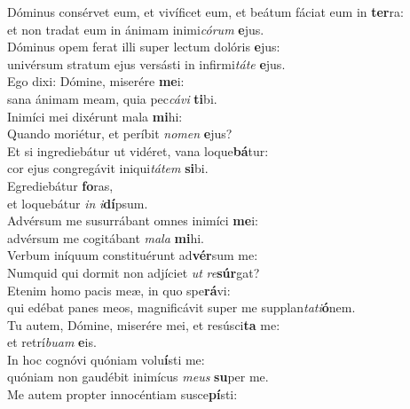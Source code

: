 \evenverse Dóminus consérvet eum, et vivíficet eum, et beátum fáciat eum in \textbf{ter}ra:~\*\\
\evenverse et non tradat eum in ánimam inimi\textit{có}\textit{rum} \textbf{e}jus.\\
\oddverse Dóminus opem ferat illi super lectum dolóris \textbf{e}jus:~\*\\
\oddverse univérsum stratum ejus versásti in infirmi\textit{tá}\textit{te} \textbf{e}jus.\\
\evenverse Ego dixi: Dómine, miserére \textbf{me}i:~\*\\
\evenverse sana ánimam meam, quia pec\textit{cá}\textit{vi} \textbf{ti}bi.\\
\oddverse Inimíci mei dixérunt mala \textbf{mi}hi:~\*\\
\oddverse Quando moriétur, et períbit \textit{no}\textit{men} \textbf{e}jus?\\
\evenverse Et si ingrediebátur ut vidéret, vana loque\textbf{bá}tur:~\*\\
\evenverse cor ejus congregávit iniqui\textit{tá}\textit{tem} \textbf{si}bi.\\
\oddverse Egrediebátur \textbf{fo}ras,~\*\\
\oddverse et loquebátur \textit{in} \textit{i}\textbf{dí}psum.\\
\evenverse Advérsum me susurrábant omnes inimíci \textbf{me}i:~\*\\
\evenverse advérsum me cogitábant \textit{ma}\textit{la} \textbf{mi}hi.\\
\oddverse Verbum iníquum constituérunt ad\textbf{vér}sum me:~\*\\
\oddverse Numquid qui dormit non adjíciet \textit{ut} \textit{re}\textbf{súr}gat?\\
\evenverse Etenim homo pacis meæ, in quo spe\textbf{rá}vi:~\*\\
\evenverse qui edébat panes meos, magnificávit super me supplan\textit{ta}\textit{ti}\textbf{ó}nem.\\
\oddverse Tu autem, Dómine, miserére mei, et resúsci\textbf{ta} me:~\*\\
\oddverse et retrí\textit{bu}\textit{am} \textbf{e}is.\\
\evenverse In hoc cognóvi quóniam volu\textbf{í}sti me:~\*\\
\evenverse quóniam non gaudébit inimícus \textit{me}\textit{us} \textbf{su}per me.\\
\oddverse Me autem propter innocéntiam susce\textbf{pí}sti:~\*\\
